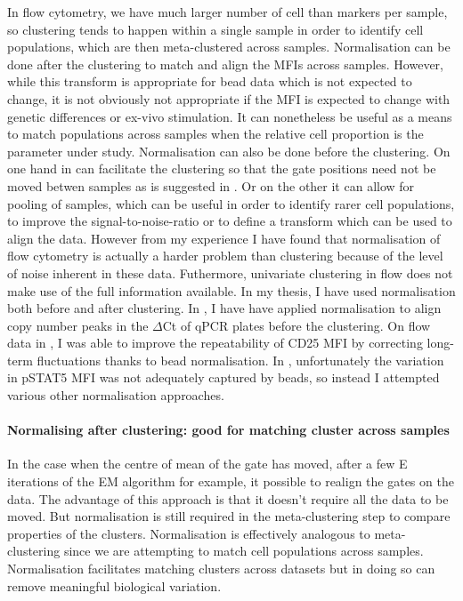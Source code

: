 In flow cytometry, we have much larger number of cell than markers per sample, so clustering tends to happen within a single sample in order to identify cell populations, which are then meta-clustered across samples.
Normalisation can be done after the clustering to match and align the MFIs across samples.
However, while this transform is appropriate for bead data which is not expected to change,
it is not obviously not appropriate if the MFI is expected to change with genetic differences or ex-vivo stimulation.
It can nonetheless be useful as a means to match populations across samples when the relative cell proportion is the parameter under study.
Normalisation can also be done before the clustering.
On one hand in can facilitate the clustering so that the gate positions need not be moved betwen samples as is suggested
in \citet{Hahne:2009hl}.
Or on the other it can allow for pooling of samples, which can be useful in order to identify rarer cell populations,
to improve the signal-to-noise-ratio or to define a transform which can be used to align the data.
However from my experience I have found that normalisation of flow cytometry is actually a harder problem than clustering because of the level of noise inherent in these data.
Futhermore, univariate clustering in flow does not make use of the full information available. 
In my thesis, I have used normalisation both before and after clustering.
In , I have have applied normalisation to align copy number peaks in the $\Delta$Ct of qPCR plates before the clustering.
On flow data in , I was able to improve the repeatability of CD25 MFI by correcting long-term
fluctuations thanks to bead normalisation.
In , unfortunately the variation in pSTAT5 MFI was not adequately captured by beads, so instead I attempted various other normalisation approaches.

\paragraph{Normalising after clustering: good for matching cluster across samples}

In the case when the centre of mean of the gate has moved, after a few E iterations of the EM algorithm for example, it possible to realign the gates on the data.
The advantage of this approach is that it doesn’t require all the data to be moved.
But normalisation is still required in the meta-clustering step to compare properties of the clusters.
Normalisation is effectively analogous to meta-clustering since we are attempting to match cell populations across samples.  
Normalisation facilitates matching clusters across datasets but in doing so can remove meaningful biological variation.  

